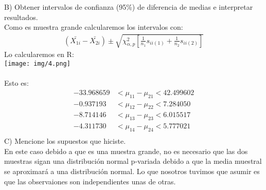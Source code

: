 \begin{sol}
\pagebreak
B) Obtener intervalos de confianza (95\%) de diferencia de medias e interpretar resultados.\\
Como es muestra grande calcularemos los intervalos con:
\begin{align*}
(\bar{X_{1i}}-\bar{X_{2i}}) \pm \sqrt{\chi_{\alpha, p}^2 \left[\frac{1}{n_1}s_{ii(1)}+\frac{1}{n_2}s_{ii(2)} \right] }
\end{align*}
Lo calcularemos en R:\\
\texttt{[image: img/4.png]}\\\\
Esto es:
\begin{align*}
-33.968659 &< \mu_{11} - \mu_{21} < 42.499602 \\
-0.937193  &< \mu_{12} - \mu_{22} < 7.284050 \\
-8.714146  &< \mu_{13} - \mu_{23} < 6.015517  \\
-4.311730  &< \mu_{14} - \mu_{24} < 5.777021  \\
\end{align*}
C) Mencione los supuestos que hiciste.\\
En este caso debido a que es una muestra grande, no es necesario que las dos muestras sigan una distribución normal p-variada debido a que la media muestral se aproximará a una distribución normal. Lo que nosotros tuvimos que asumir es que las observaiones son independientes unas de otras.

\end{sol}